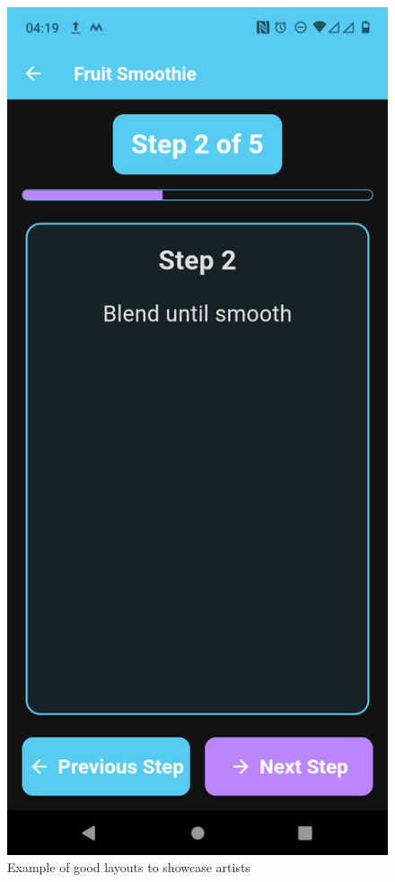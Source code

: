 \documentclass[]{project_final}
\begin{document}
\begin{figure}[ht!]
\begin{minipage}[t]{0.4\textwidth}
  \end{minipage}
  \hfill
  \begin{minipage}[t]{0.4\textwidth}
    \includegraphics[height=0.5\textheight]{STEP2.png}
  \end{minipage}
  \caption{Example of good layouts to showcase artists}
  \label{fig:1}
\end{figure}
\end{document}

